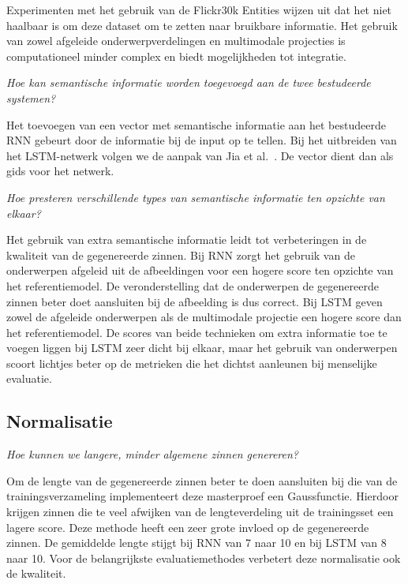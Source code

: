 Experimenten met het gebruik van de Flickr30k Entities wijzen uit dat het niet haalbaar is om deze dataset om te zetten naar bruikbare informatie. Het gebruik van zowel afgeleide onderwerpverdelingen en multimodale projecties is computationeel minder complex en biedt mogelijkheden tot integratie.

\emph{Hoe kan semantische informatie worden toegevoegd aan de twee bestudeerde systemen?}

Het toevoegen van een vector met semantische informatie aan het bestudeerde RNN gebeurt door de informatie bij de input op te tellen. Bij het uitbreiden van het LSTM-netwerk volgen we de aanpak van Jia et al.~\cite{Fernando2015}. De vector dient dan als gids voor het netwerk.

\emph{Hoe presteren verschillende types van semantische informatie ten opzichte van elkaar?}

Het gebruik van extra semantische informatie leidt tot verbeteringen in de kwaliteit van de gegenereerde zinnen. 
Bij RNN zorgt het gebruik van de onderwerpen afgeleid uit de afbeeldingen voor een hogere score ten opzichte van het referentiemodel. 
De veronderstelling dat de onderwerpen de gegenereerde zinnen beter doet aansluiten bij de afbeelding is dus correct.
Bij LSTM geven zowel de afgeleide onderwerpen als de multimodale projectie een hogere score dan het referentiemodel. 
De scores van beide technieken om extra informatie toe te voegen liggen bij LSTM zeer dicht bij elkaar, maar het gebruik van onderwerpen scoort lichtjes beter op de metrieken die het dichtst aanleunen bij menselijke evaluatie.

\subsection{Normalisatie}
\emph{Hoe kunnen we langere, minder algemene zinnen genereren?}

Om de lengte van de gegenereerde zinnen beter te doen aansluiten bij die van de trainingsverzameling implementeert deze masterproef een Gaussfunctie. Hierdoor krijgen zinnen die te veel afwijken van de lengteverdeling uit de trainingsset een lagere score. 
Deze methode heeft een zeer grote invloed op de gegenereerde zinnen. De gemiddelde lengte stijgt bij RNN van 7 naar 10 en bij LSTM van 8 naar 10. Voor de belangrijkste evaluatiemethodes verbetert deze normalisatie ook de kwaliteit.

